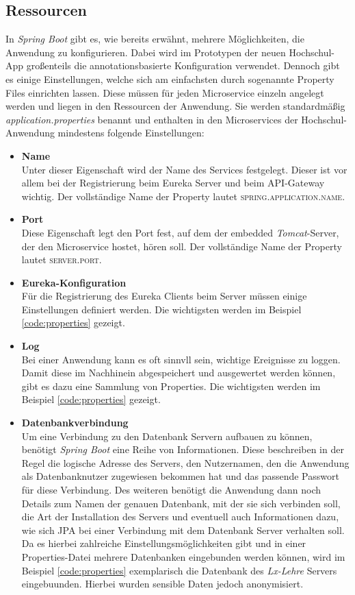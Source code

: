 \subsection*{Ressourcen}
\label{sec:resources}

In \textit{Spring Boot} gibt es, wie bereits erwähnt, mehrere Möglichkeiten, die Anwendung zu konfigurieren. Dabei wird im Prototypen der neuen Hochschul-\ac{App} großenteils die annotationsbasierte Konfiguration verwendet. Dennoch gibt es einige Einstellungen, welche sich am einfachsten durch sogenannte Property Files einrichten lassen. Diese müssen für jeden Microservice einzeln angelegt werden und liegen in den Ressourcen der Anwendung. Sie werden standardmäßig \textit{application.properties} benannt und enthalten in den Microservices der Hochschul-Anwendung mindestens folgende Einstellungen:

\begin{itemize}
\item \textbf{Name}\\
Unter dieser Eigenschaft wird der Name des Services festgelegt. Dieser ist vor allem bei der Registrierung beim Eureka Server und beim \ac{API}-Gateway wichtig. Der vollständige Name der Property lautet \textsc{spring.application.name}.
\item \textbf{Port}\\
Diese Eigenschaft legt den Port fest, auf dem der embedded \textit{Tomcat}-Server, der den Microservice hostet, hören soll. Der vollständige Name der Property lautet \textsc{server.port}.
\item \textbf{Eureka-Konfiguration}\\
Für die Registrierung des Eureka Clients beim Server müssen einige Einstellungen definiert werden. Die wichtigsten werden im Beispiel \ref{code:properties} gezeigt.
\item \textbf{Log}\\
Bei einer Anwendung kann es oft sinnvll sein, wichtige Ereignisse zu loggen. Damit diese im Nachhinein abgespeichert und ausgewertet werden können, gibt es dazu eine Sammlung von Properties. Die wichtigsten werden im Beispiel \ref{code:properties} gezeigt.
\item \textbf{Datenbankverbindung}\\
Um eine Verbindung zu den Datenbank Servern aufbauen zu können, benötigt \textit{Spring Boot} eine Reihe von Informationen. Diese beschreiben in der Regel die logische Adresse des Servers, den Nutzernamen, den die Anwendung als Datenbanknutzer zugewiesen bekommen hat und das passende Passwort für diese Verbindung. Des weiteren benötigt die Anwendung dann noch Details zum Namen der genauen Datenbank, mit der sie sich verbinden soll, die Art der Installation des Servers und eventuell auch Informationen dazu, wie sich \ac{JPA} bei einer Verbindung mit dem Datenbank Server verhalten soll. Da es hierbei zahlreiche Einstellungsmöglichkeiten gibt und in einer Properties-Datei mehrere Datenbanken eingebunden werden können, wird im Beispiel \ref{code:properties} exemplarisch die Datenbank des \textit{Lx-Lehre} Servers eingebuunden. Hierbei wurden sensible Daten jedoch anonymisiert. 
\end{itemize}

